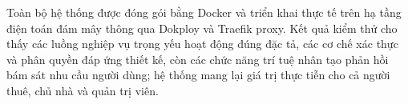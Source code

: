 Toàn bộ hệ thống được đóng gói bằng Docker và triển khai thực tế trên hạ tầng điện toán đám mây thông qua Dokploy và Traefik proxy. Kết quả kiểm thử cho thấy các luồng nghiệp vụ trọng yếu hoạt động đúng đặc tả, các cơ chế xác thực và phân quyền đáp ứng thiết kế, còn các chức năng trí tuệ nhân tạo phản hồi bám sát nhu cầu người dùng; hệ thống mang lại giá trị thực tiễn cho cả người thuê, chủ nhà và quản trị viên.
